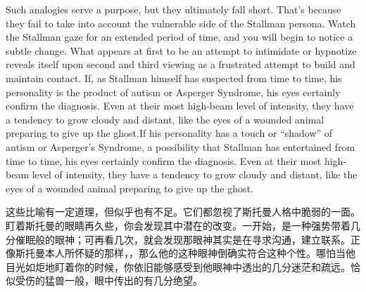 

\fi

\ifdefined\eng
Such analogies serve a purpose, but they ultimately fall short. That's because they fail to take into account the vulnerable side of the Stallman persona. Watch the Stallman gaze for an extended period of time, and you will begin to notice a subtle change. What appears at first to be an attempt to intimidate or hypnotize reveals itself upon second and third viewing as a frustrated attempt to build and maintain contact. \ifdefined\vone If, as Stallman himself has suspected from time to time, his personality is the product of autism or Asperger Syndrome, his eyes certainly confirm the diagnosis. Even at their most high-beam level of intensity, they have a tendency to grow cloudy and distant, like the eyes of a wounded animal preparing to give up the ghost.\fi\ifdefined\vtwo If his personality has a touch or ``shadow'' of autism or Asperger's Syndrome, a possibility that Stallman has entertained from time to time, his eyes certainly confirm the diagnosis. Even at their most high-beam level of intensity, they have a tendency to grow cloudy and distant, like the eyes of a wounded animal preparing to give up the ghost.\fi
\fi

\ifdefined\chs
\ifdefined\spv
这些比喻有一定道理，但似乎也有不足。它们都忽视了斯托曼人格中脆弱的一面。盯着斯托曼的眼睛再久些，你会发现其中潜在的改变。一开始，是一种强势带着几分催眠般的眼神；可再看几次，就会发现那眼神其实是在寻求沟通，建立联系。\ifdefined\vone 正像斯托曼本人所怀疑的那样，，那么他的这种眼神倒确实符合这种个性。哪怕当他目光如炬地盯着你的时候，你依旧能够感受到他眼神中透出的几分迷茫和疏远。恰似受伤的猛兽一般，眼中传出的有几分绝望。
\fi
\fi

